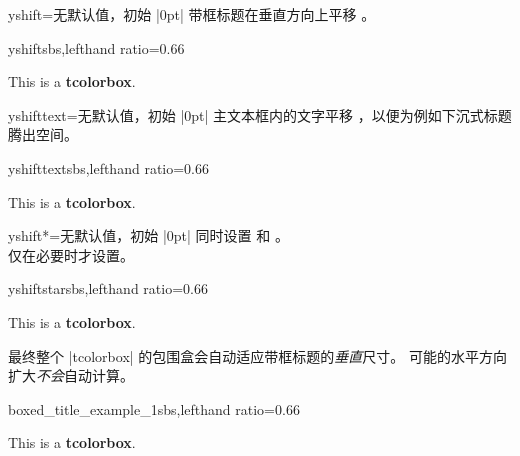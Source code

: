 \begin{boxTcbKey}{yshift}{=}{无默认值，初始 |0pt|}
带框标题在垂直方向上平移 。
\begin{exdispExample*}{yshift}{sbs,lefthand ratio=0.66}
\begin{tcolorbox}[enhanced,title=My title,
  attach boxed title to top center=
    {yshift=-\tcboxedtitleheight/2},
  boxed title style={size=small,colback=blue}]
  This is a \textbf{tcolorbox}.
\end{tcolorbox}
\end{exdispExample*}
\end{boxTcbKey}

\begin{boxTcbKey}{yshifttext}{=}{无默认值，初始 |0pt|}
主文本框内的文字平移 ，以便为例如下沉式标题腾出空间。
\begin{exdispExample*}{yshifttext}{sbs,lefthand ratio=0.66}
\begin{tcolorbox}[enhanced,title=My title,
  attach boxed title to top center=
    {yshift=-3mm,yshifttext=-1mm},
  boxed title style={size=small,colback=blue}]
  This is a \textbf{tcolorbox}.
\end{tcolorbox}
\end{exdispExample*}
\end{boxTcbKey}

\begin{boxTcbKey}{yshift*}{=}{无默认值，初始 |0pt|}
同时设置 
和 。\\
 仅在必要时才设置。
\begin{exdispExample*}{yshiftstar}{sbs,lefthand ratio=0.66}
\begin{tcolorbox}[enhanced,title=My title,
  attach boxed title to top center={yshift*=-3mm},
  boxed title style={size=small,colback=blue}]
  This is a \textbf{tcolorbox}.
\end{tcolorbox}
\end{exdispExample*}
\end{boxTcbKey}

\begin{marker}
最终整个 |tcolorbox| 的包围盒会自动适应带框标题的\emph{垂直}尺寸。
可能的水平方向扩大\emph{不会}自动计算。
\end{marker}


\begin{exdispExample*}{boxed_title_example_1}{sbs,lefthand ratio=0.66}
\begin{tcolorbox}[enhanced,title=My title,
  attach boxed title to top left=
    {xshift=-2mm,yshift=-2mm},
  boxed title style={size=small,colback=blue},
  show bounding box]
  This is a \textbf{tcolorbox}.
\end{tcolorbox}
\end{exdispExample*}


